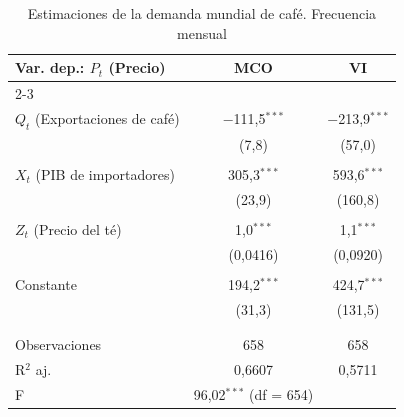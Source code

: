 \scriptsize
\begin{table}[H] \centering 
\caption{Estimaciones de la demanda mundial de café. Frecuencia mensual} 
\label{tab:est_demand_ym}
\begin{tabular}{@{\extracolsep{5pt}}lcc} 
\hline 
\hline 
Var. dep.: $P_{t}$ (Precio) & MCO & VI \\ 
\cline{2-3} 
\\[-1.8ex] 
$Q_{t}$ (Exportaciones de café)  & $-$111,5$^{***}$ & $-$213,9$^{***}$ \\ 
  & (7,8) & (57,0) \\ 
  & & \\ 
$X_{t}$ (PIB de importadores) & 305,3$^{***}$ & 593,6$^{***}$ \\ 
  & (23,9) & (160,8) \\ 
  & & \\ 
$Z_{t}$ (Precio del té) & 1,0$^{***}$& 1,1$^{***}$ \\ 
  & (0,0416) & (0,0920) \\ 
  & &\\ 
Constante & 194,2$^{***}$ & 424,7$^{***}$ \\ 
  & (31,3) & (131,5) \\ 
  & & \\ 
\hline \\[-1.8ex] 
Observaciones & 658 & 658 \\ 
R$^{2}$ aj. & 0,6607 & 0,5711 \\ 
F & 96,02$^{***}$ (df = 654) & \\ 
\hline 
\hline
\end{tabular}
\end{table}